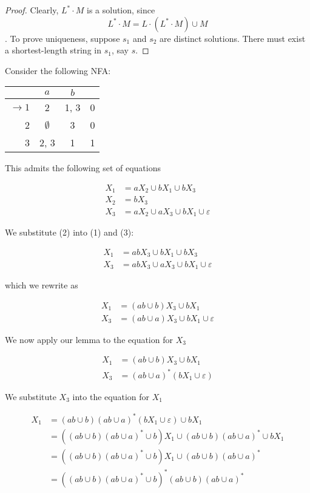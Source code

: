 \begin{proof}
      Clearly, $L^*\cdot M$ is a solution, since \[L^*\cdot M = L\cdot (L^*\cdot M)\cup M\]. To prove uniqueness, suppose $s_1$ and $s_2$ are distinct solutions. There must exist a shortest-length string in $s_1$, say $s$. 
\end{proof}

Consider the following NFA:

\begin{center}\begin{tabular}{r| c c r}
      & $a$ & $b$ & \\\hline
      $\to 1$ & 2 & 1, 3 & 0\\
            2 & $\emptyset$ & 3 & 0\\
            3 & 2, 3 & 1 & 1
 \end{tabular}\end{center}

This admits the following set of equations 

\begin{align}
      X_1 &= aX_2\cup bX_1\cup bX_3\\
      X_2 &= bX_3\\
      X_3 &= aX_2\cup aX_3\cup bX_1\cup\varepsilon
\end{align}

We substitute (2) into (1) and (3):

\begin{align*}
      X_1 &= abX_3\cup bX_1\cup bX_3\\
      X_3 &= abX_3\cup aX_3\cup bX_1\cup\varepsilon
\end{align*}

which we rewrite as

\begin{align*}
      X_1 &= (ab\cup b)X_3\cup bX_1\\
      X_3 &= (ab\cup a)X_3\cup bX_1\cup\varepsilon
\end{align*}

We now apply our lemma to the equation for $X_3$

\begin{align*}
      X_1 &= (ab\cup b)X_3\cup bX_1\\
      X_3 &= (ab\cup a)^*(bX_1\cup\varepsilon)
\end{align*}

We substitute $X_3$ into the equation for $X_1$

\begin{align*}
      X_1&=(ab\cup b)(ab\cup a)^*(bX_1\cup\varepsilon)\cup bX_1\\
         &=\left((ab\cup b)(ab\cup a)^*\cup b\right)X_1\cup (ab\cup b)(ab\cup a)^*\cup bX_1\\
         &=\left((ab\cup b)(ab\cup a)^*\cup b\right)X_1\cup (ab\cup b)(ab\cup a)^*\\
         &=\left((ab\cup b)(ab\cup a)^*\cup b\right)^*(ab\cup b)(ab\cup a)^*
\end{align*}


